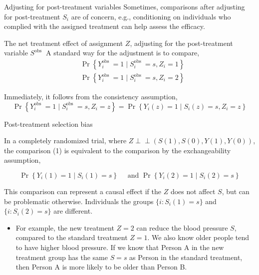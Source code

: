 \documentclass[10pt]{beamer}
\begin{document}
\begin{frame}{Adjusting for post-treatment variables}
Sometimes, comparisons after adjusting for post-treatment $S_i$ are of concern, e.g., conditioning on individuals who complied with the assigned treatment can help assess the efficacy. 

\begin{block}{The net treatment effect of assignment $Z$, adjusting for the post-treatment variable $S^{\text {obs }}$}
A standard way for the adjustment is to compare,
\begin{equation}
\begin{aligned}
& \Pr\left\{Y_i^{\text {obs }} = 1 \mid S_i^{\text {obs }}=s, Z_i=1\right\} \\
& \Pr\left\{Y_i^{\text {obs }} = 1\mid S_i^{\text {obs }}=s, Z_i=2\right\}
\end{aligned}
\end{equation}
\end{block}
Immediately, it follows from the consistency assumption, 
$$\Pr\left\{Y_i^{\text {obs }} = 1\mid S_i^{\text {obs }}=s, Z_i=z\right\} = \Pr\left\{Y_i (z)  = 1\mid S_i(z)=s, Z_i=z\right\} $$
\end{frame}

\begin{frame}{Post-treatment selection bias}

In a completely randomized trial, where $Z \perp \!\!\! \perp (S(1), S(0), Y(1), Y(0))$, the comparison (1) is equivalent to the comparison by the exchangeability assumption,

$$
\Pr\left\{Y_i(1) = 1 \mid S_i(1)=s\right\} \quad \text { and } \Pr\left\{Y_i(2) =1\mid S_i(2)=s\right\}
$$

This comparison can represent a causal effect if the $Z$ does not affect $S$, but can be problematic otherwise. Individuals the groups $\{i: S_i(1) = s\}$ and $\{i: S_i(2) = s\}$ are different. 

\begin{itemize}
    \item For example,  the new treatment $Z = 2$ can reduce the blood pressure $S$, compared to the standard treatment $Z=1$. We also know older people tend to have higher blood pressure. If we know that Person A in the new treatment group has the same $S=s$ as Person in the standard treatment, then Person A is more likely to be older than Person B.
\end{itemize}

\end{frame}
\end{document}
